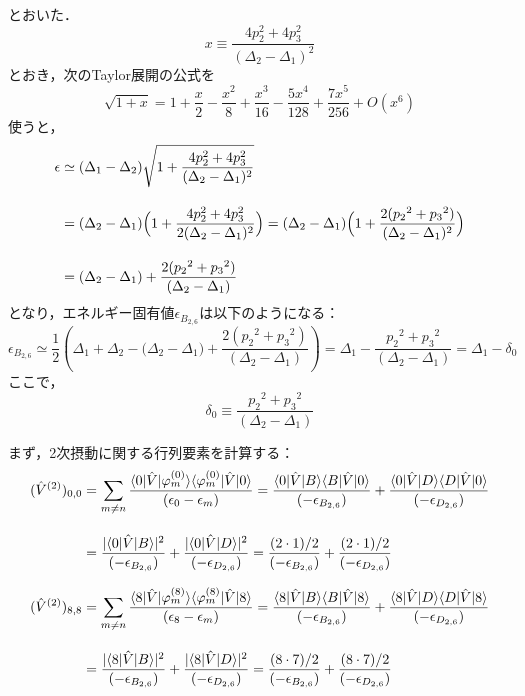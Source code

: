 とおいた．
\begin{equation}
    x\equiv\frac{4p_2^2+4p_3^2}{(\Delta_{2}-\Delta_{1})^2}
\end{equation}
とおき，次のTaylor展開の公式を
\begin{equation}
    \sqrt{1+x}
    =1+\frac{x}{2}-\frac{x^2}{8}+\frac{x^3}{16}-\frac{5x^4}{128}+\frac{7x^5}{256}+O\left(x^6\right)
\end{equation}
使うと，
\begin{align}
    \epsilon
    &\simeq{(\Delta_{1}}-\Delta_{2})
    \sqrt{1+\frac{4p_2^2+4p_3^2}{(\Delta_{2}-\Delta_{1})^2}}\nn[10pt]
    &={(\Delta_{2}}-{\Delta_{1}})
    \Bigl(1+\frac{4p_2^2+4p_3^2}{2(\Delta_{2}-\Delta_{1})^2}\Bigr)
    ={(\Delta_{2}}-{\Delta_{1}})
    \Bigl(1+\frac{2({p_{2}}^2+{p_{3}}^2)}{(\Delta_{2}-\Delta_{1})^2}\Bigr)\nn[10pt]
    &={(\Delta_{2}}-{\Delta_{1}})
    +\frac{2({p_{2}}^2+{p_{3}}^2)}{(\Delta_{2}-\Delta_{1})}
\end{align}
となり，エネルギー固有値$\epsilon_{B_{2,6}}$は以下のようになる：
\begin{equation}
    \epsilon_{B_{2,6}}
    \simeq\frac{1}{2}\left({\Delta_{1}}
    +{\Delta_{2}}-{(\Delta_{2}}-{\Delta_{1}})
    +\frac{2({p_{2}}^2+{p_{3}}^2)}{(\Delta_{2}-\Delta_{1})}\right)
    =\Delta_1 - \frac{{p_{2}}^2+{p_{3}}^2}{(\Delta_{2}-\Delta_{1})}
    =\Delta_1 - \delta_0
\end{equation}
ここで，
\begin{equation}
    \delta_0 \equiv \frac{{p_{2}}^2+{p_{3}}^2}{(\Delta_{2}-\Delta_{1})}
\end{equation}

まず，2次摂動に関する行列要素を計算する：
\begin{align}
    (\hat{V}^{(2)})_{0,0}
    &=\sum_{m\neq n}
    \frac{\langle{0|\hat{V}|\varphi^{(0)}_m}\rangle
    \langle{\varphi^{(0)}_{m}|\hat{V}|0}\rangle}
    {(\epsilon_0-\epsilon_m)}
    =
    \frac{\langle{0|\hat{V}|B}\rangle
    \langle{B|\hat{V}|0}\rangle}
    {(-\epsilon_{B_{2,6}})}
    +\frac{\langle{0|\hat{V}|D}\rangle
    \langle{D|\hat{V}|0}\rangle}
    {(-\epsilon_{D_{2,6}})}\nn[10pt]
    &=\frac{|\langle{0|\hat{V}|B}\rangle|^2}
    {(-\epsilon_{B_{2,6}})}
    +\frac{|\langle{0|\hat{V}|D}\rangle|^2}
    {(-\epsilon_{D_{2,6}})}
    =\frac{(2\cdot1)  / 2}
    {(-\epsilon_{B_{2,6}})}
    +\frac{(2\cdot1)  / 2}
    {(-\epsilon_{D_{2,6}})}
\end{align}


\begin{align}
    (\hat{V}^{(2)})_{8,8}
    &=\sum_{m\neq n}
    \frac{\langle{8|\hat{V}|\varphi^{(8)}_m}\rangle
    \langle{\varphi^{(8)}_{m}|\hat{V}|8}\rangle}
    {(\epsilon_8-\epsilon_m)}
    =
    \frac{\langle{8|\hat{V}|B}\rangle
    \langle{B|\hat{V}|8}\rangle}
    {(-\epsilon_{B_{2,6}})}
    +\frac{\langle{8|\hat{V}|D}\rangle
    \langle{D|\hat{V}|8}\rangle}
    {(-\epsilon_{D_{2,6}})}\nn[10pt]
    &=\frac{|\langle{8|\hat{V}|B}\rangle|^2}
    {(-\epsilon_{B_{2,6}})}
    +\frac{|\langle{8|\hat{V}|D}\rangle|^2}
    {(-\epsilon_{D_{2,6}})}
    =\frac{(8\cdot7) / 2}
    {(-\epsilon_{B_{2,6}})}
    +\frac{(8\cdot7) / 2}
    {(-\epsilon_{D_{2,6}})}
\end{align}




